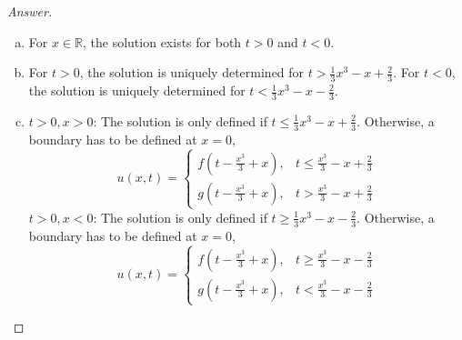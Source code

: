 \documentclass{article}
\theoremstyle{definition}
\renewcommand\qedsymbol{$\blacksquare$}
\newenvironment{ans}{\begin{proof}[Answer]\renewcommand{\qedsymbol}{}}{\end{proof}}
\newcommand{\R}{\mathbb{R}}
\begin{document}
\begin{ans}
\begin{enumerate}[(1), series=answers]
\begin{enumerate}[a)]
                    \item For $x \in \R$, the solution exists for both $t > 0$ and $t < 0$.

                    \item For $t > 0$, the solution is uniquely determined for $t > \frac{1}{3}x^3 - x + \frac{2}{3}$. For $t < 0$, the solution is uniquely determined for $t < \frac{1}{3}x^3 - x - \frac{2}{3}$.

                    \item \underline{$t > 0, x > 0$}: The solution is only defined if $t \leq \frac{1}{3}x^3 - x + \frac{2}{3}$. Otherwise, a boundary has to be defined at $x = 0$,
                    \begin{equation*}
                    u(x,t) =
                    \begin{cases}
                        f\left(t - \frac{x^3}{3} + x\right), & t \leq \frac{x^3}{3} - x + \frac{2}{3}\\
                        g\left(t - \frac{x^3}{3} + x\right), & t > \frac{x^3}{3} - x + \frac{2}{3}
                    \end{cases}
                    \end{equation*}
                    \underline{$t > 0, x < 0$}: The solution is only defined if $t \geq \frac{1}{3}x^3 - x - \frac{2}{3}$. Otherwise, a boundary has to be defined at $x = 0$,
                    \begin{equation*}
                    u(x,t) =
                    \begin{cases}
                        f\left(t - \frac{x^3}{3} + x\right), & t \geq \frac{x^3}{3} - x - \frac{2}{3}\\
                        g\left(t - \frac{x^3}{3} + x\right), & t < \frac{x^3}{3} - x - \frac{2}{3}
                    \end{cases}
                    \end{equation*}


\end{enumerate}
\end{enumerate}
\end{ans}
\end{document}
